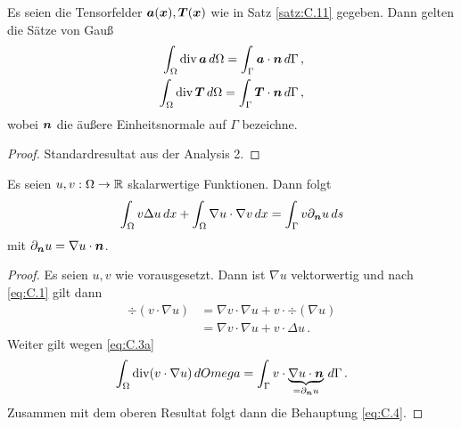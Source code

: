 \begin{satz}\label{satz:C.12}
Es seien die Tensorfelder $\boldsymbol a(\boldsymbol x), \boldsymbol T(\boldsymbol x)$ wie in Satz \ref{satz:C.11} gegeben. Dann gelten die Sätze von Gauß
\begin{subequations}\label{eq:C.3}
\begin{align}\label{eq:C.3a}
	\int_{\Omega} \operatorname{div} \boldsymbol a \, d\Omega = \int_\Gamma \boldsymbol a \cdot \boldsymbol n \, d\Gamma \, , \\
	\label{eq:C.3b}
	\int_{\Omega} \operatorname{div} \boldsymbol T \, d\Omega = \int_\Gamma \boldsymbol T \cdot \boldsymbol n \, d\Gamma  \, , 
\end{align}
\end{subequations}
wobei $\boldsymbol n$ die äußere Einheitsnormale auf $\Gamma$ bezeichne.
\end{satz}

\begin{proof}
Standardresultat aus der Analysis 2.
\end{proof}

\begin{kor}\label{kor:C.13}
Es seien $u,v : \Omega \rightarrow \mathbb{R}$ skalarwertige Funktionen. Dann folgt
\begin{align}\label{eq:C.4}
	\int_{\Omega} v \Delta u \, dx + \int_{\Omega} \nabla u \cdot \nabla v \, dx = \int_{\Gamma} v \partial_{\boldsymbol n} u \, ds
\end{align}
mit $\partial_{\boldsymbol n} u = \nabla u \cdot \boldsymbol n$.
\end{kor}

\begin{proof}
Es seien $u,v$ wie vorausgesetzt. Dann ist $\nabla u$ vektorwertig und nach \eqref{eq:C.1} gilt dann
\begin{align*}
	\div (v \cdot \nabla u) & = \nabla v \cdot \nabla u + v \cdot \div(\nabla u) \\
	& =  \nabla v \cdot \nabla u + v \cdot \Delta u \, .
\end{align*}
Weiter gilt wegen \eqref{eq:C.3a}
\[
	\int_{\Omega} \operatorname{div} (v \cdot \nabla u) \, dOmega = \int_\Gamma v \cdot \underbrace{\nabla u \cdot \boldsymbol n}_{=\partial_{\boldsymbol n} u} \, d\Gamma \, .
\]
Zusammen mit dem oberen Resultat folgt dann die Behauptung \eqref{eq:C.4}.
\end{proof}




\label{anhang:D}


